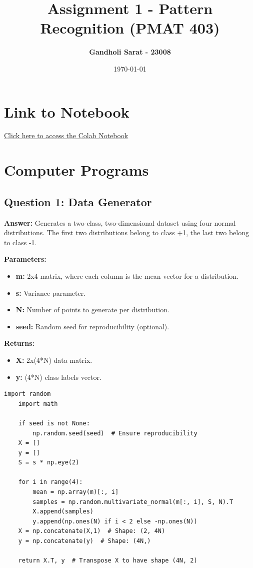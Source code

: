 \documentclass[a4paper,12pt]{article}
\title{\textbf{Assignment 1 - Pattern Recognition (PMAT 403)}}
\author{\textbf{Gandholi Sarat - 23008 } }
\date{\today}
\begin{document}
\maketitle


\section*{Link to Notebook}
\href{https://colab.research.google.com/drive/1zJLuFBV0DYH311h503UJMq7Wiyi12hVe?usp=sharing}{Click here to access the Colab Notebook}

\tableofcontents
\listoffigures
\newpage


\section{Computer Programs}

\subsection{Question 1: Data Generator}
\textbf{Answer:} Generates a two-class, two-dimensional dataset using four normal distributions.  
The first two distributions belong to class +1, the last two belong to class -1.

\textbf{Parameters:}
\begin{itemize}
    \item \textbf{m:} 2x4 matrix, where each column is the mean vector for a distribution.
    \item \textbf{s:} Variance parameter.
    \item \textbf{N:} Number of points to generate per distribution.
    \item \textbf{seed:} Random seed for reproducibility (optional).
\end{itemize}

\textbf{Returns:}
\begin{itemize}
    \item \textbf{X:} 2x(4*N) data matrix.
    \item \textbf{y:} (4*N) class labels vector.
\end{itemize}
\begin{lstlisting}[style=python]
    import random
    import math

    if seed is not None:
        np.random.seed(seed)  # Ensure reproducibility
    X = []
    y = []
    S = s * np.eye(2)

    for i in range(4):
        mean = np.array(m)[:, i]
        samples = np.random.multivariate_normal(m[:, i], S, N).T
        X.append(samples)
        y.append(np.ones(N) if i < 2 else -np.ones(N))  
    X = np.concatenate(X,1)  # Shape: (2, 4N)
    y = np.concatenate(y)  # Shape: (4N,)

    return X.T, y  # Transpose X to have shape (4N, 2)
\end{lstlisting}
\newpage

\end{document}
